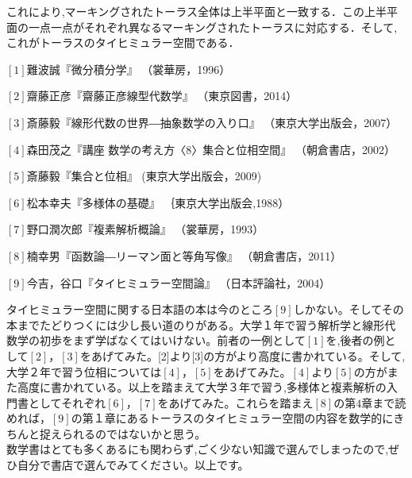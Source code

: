 \begin{figure}[h]
\begin{minipage}{0.5\hsize}
\end{minipage}
\begin{minipage}{0.5\hsize}
\end{minipage}
\end{figure}
これにより,マーキングされたトーラス全体は上半平面と一致する．この上半平面の一点一点がそれぞれ異なるマーキングされたトーラスに対応する．そして,これがトーラスのタイヒミュラー空間である．
\begin{description}
\item
$[1]$難波誠『微分積分学』
（裳華房，1996）
\item
$[2]$齋藤正彦『齋藤正彦線型代数学』
（東京図書，2014）
\item
$[3]$斎藤毅『線形代数の世界―抽象数学の入り口』
（東京大学出版会，2007）
\item
$[4]$森田茂之『講座 数学の考え方〈8〉集合と位相空間』
（朝倉書店，2002）
\item
$[5]$斎藤毅『集合と位相』
(東京大学出版会，2009)
\item
$[6]$松本幸夫『多様体の基礎』
｛東京大学出版会,1988）
\item
$[7]$野口潤次郎『複素解析概論』
（裳華房，1993）
\item
$[8]$楠幸男『函数論―リーマン面と等角写像』
（朝倉書店，2011）
\item
$[9]$今吉，谷口『タイヒミュラー空間論』
（日本評論社，2004）
\end{description}
タイヒミュラー空間に関する日本語の本は今のところ$[9]$しかない。そしてその本までたどりつくには少し長い道のりがある。大学１年で習う解析学と線形代数学の初歩をまず学ばなくてはいけない。前者の一例として$[1]$を,後者の例として$[2]，[3]$をあげてみた。[2]より[3]の方がより高度に書かれている。そして,大学２年で習う位相については$[4]，[5]$をあげてみた。$[4]$より$[5]$の方がまた高度に書かれている。以上を踏まえて大学３年で習う,多様体と複素解析の入門書としてそれぞれ$[6]，[7]$をあげてみた。これらを踏まえ$[8]$の第$4$章まで読めれば，$[9]$の第１章にあるトーラスのタイヒミュラー空間の内容を数学的にきちんと捉えられるのではないかと思う。\\
数学書はとても多くあるにも関わらず,ごく少ない知識で選んでしまったので,ぜひ自分で書店で選んでみてください。以上です。







